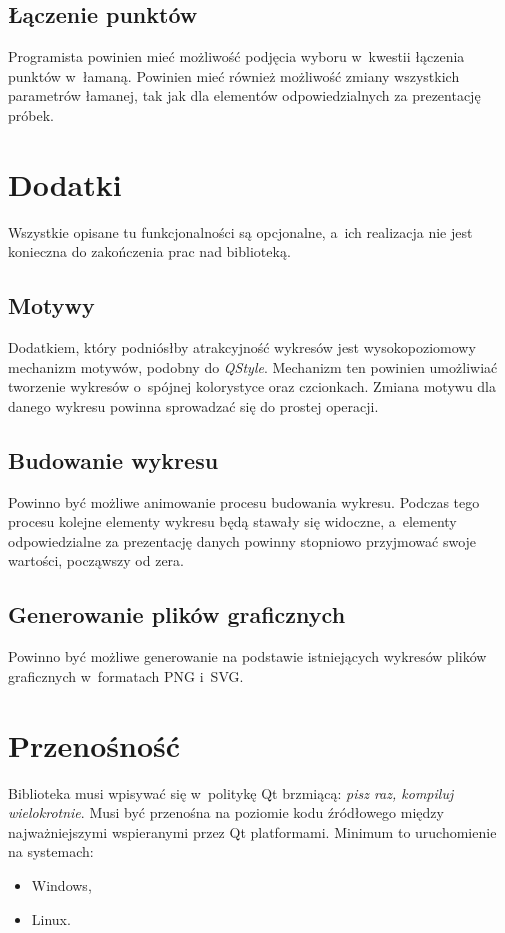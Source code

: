 \subsection{Łączenie punktów}
Programista powinien mieć możliwość podjęcia wyboru w~kwestii łączenia punktów w~łamaną. Powinien mieć również możliwość zmiany wszystkich parametrów łamanej, tak jak dla elementów odpowiedzialnych za prezentację próbek.

\section{Dodatki}
Wszystkie opisane tu funkcjonalności są opcjonalne, a~ich realizacja nie jest konieczna do zakończenia prac nad biblioteką.

\subsection{Motywy}
Dodatkiem, który podniósłby atrakcyjność wykresów jest wysokopoziomowy mechanizm motywów, podobny do \textit{QStyle}. Mechanizm ten powinien umożliwiać tworzenie wykresów o~spójnej kolorystyce oraz czcionkach. Zmiana motywu dla danego wykresu powinna sprowadzać się do prostej operacji.

\subsection{Budowanie wykresu}
Powinno być możliwe animowanie procesu budowania wykresu. Podczas tego procesu kolejne elementy wykresu będą stawały się widoczne, a~elementy odpowiedzialne za prezentację danych powinny stopniowo przyjmować swoje wartości, począwszy od zera.

\subsection{Generowanie plików graficznych}
Powinno być możliwe generowanie na podstawie istniejących wykresów plików graficznych  w~formatach PNG i~SVG.

\section{Przenośność}
Biblioteka musi wpisywać się w~politykę Qt brzmiącą: \textit{pisz raz, kompiluj wielokrotnie}. Musi być przenośna na poziomie kodu źródłowego między najważniejszymi wspieranymi przez Qt platformami.
Minimum to uruchomienie na systemach:
\begin{itemize}
\item{Windows,}
\item{Linux.}
\end{itemize}


